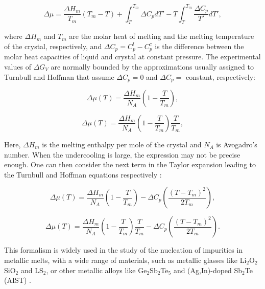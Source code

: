 \begin{equation}
    \Delta\mu = \frac{\Delta H_{m}}{T_{m}}(T_{m} - T) + \int_{T}^{T_{m}} \Delta C_{p} dT' - T \int_{T}^{T_{m}} \frac{\Delta C_{p}}{T'} dT',
\end{equation}

where \(\Delta H_{m}\) and \(T_{m}\) are the molar heat of melting and the melting temperature of the crystal, respectively, and \(\Delta C_{p} = C_{p}^{l} - C_{p}^{c}\) is the difference between the molar heat capacities of liquid and crystal at constant pressure. The experimental values of \(\Delta G_{V}\) are normally bounded by the approximations usually assigned to Turnbull and Hoffman that assume \(\Delta C_{p} = 0\) and \(\Delta C_{p} = \) constant, respectively:

\begin{equation}
    \Delta\mu(T) =  \frac{\Delta H_{m}}{N_A} \left( 1 - \frac{T}{T_{m}} \right),
	\label{fig:turnbull_delta}
\end{equation}

\begin{equation}
    \Delta\mu(T) = \frac{\Delta H_{m}}{N_A} \left( 1 - \frac{T}{T_{m}} \right) \frac{T}{T_{m}},
	\label{fig:hoffmann_delta}
\end{equation}

Here, \(\Delta H_{m}\) is the melting enthalpy per mole of the crystal and \(N_A\) is Avogadro's number. When the undercooling is large, the expression may not be precise enough. One can then consider the next term in the Taylor expansion leading to the Turnbull and Hoffman equations respectively \cite{Clouet1}:

\begin{equation}
    \Delta\mu(T) = \frac{\Delta H_{m}}{N_A} \left( 1 - \frac{T}{T_{m}} \right)  - \Delta C_{p} \left( \frac{(T - T_{m})^2}{2T_{m}} \right),
\end{equation}

\begin{equation}
    \Delta\mu(T) =  \frac{\Delta H_{m}}{N_A} \left( 1 - \frac{T}{T_{m}} \right) \frac{T}{T_{m}}   - \Delta C_{p} \left( \frac{(T - T_{m})^2}{2T_{m}} \right).
\end{equation}

This formalism is widely used in the study of the nucleation of impurities in metallic melts, with a wide range of materials, such 
as metallic glasses like Li\(_2\)O\(_2\)SiO\(_2\) and LS\(_2\), or other metallic alloys 
like Ge\(_2\)Sb\(_2\)Te\(_5\) and (Ag,In)-doped Sb\(_2\)Te (AIST) \cite{Laszlo1, Neilson1979, Kelton1983, Laszlo3, Laszlo4, Sun2009}.

